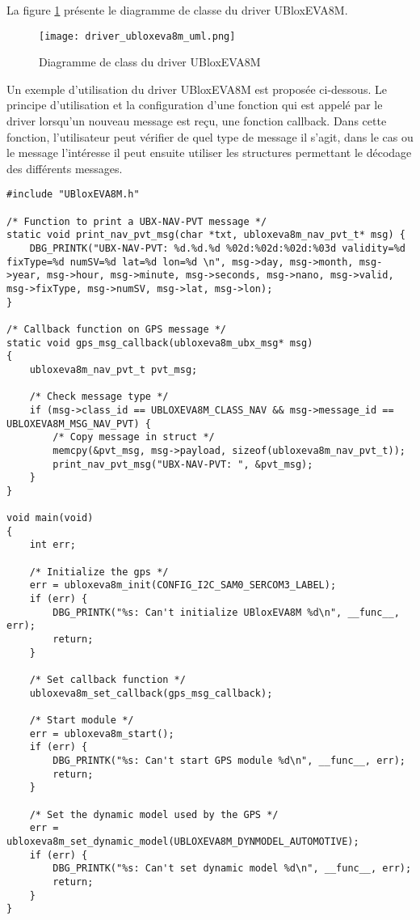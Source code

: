 La figure \ref{fig:driver_ubloxeva8m_uml} présente le diagramme de classe du driver UBloxEVA8M.

\begin{figure}[htb]
\centering 
\texttt{[image: driver\_ubloxeva8m\_uml.png]} 
\caption{Diagramme de class du driver UBloxEVA8M}
\label{fig:driver_ubloxeva8m_uml}
\end{figure}

Un exemple d'utilisation du driver UBloxEVA8M est proposée ci-dessous. Le principe d'utilisation et la configuration d'une fonction qui est appelé par le driver lorsqu'un nouveau message est reçu, une fonction callback. Dans cette fonction, l'utilisateur peut vérifier de quel type de message il s'agit, dans le cas ou le message l'intéresse il peut ensuite utiliser les structures permettant le décodage des différents messages.

\begin{lstlisting}[style=CStyle]
#include "UBloxEVA8M.h"

/* Function to print a UBX-NAV-PVT message */
static void print_nav_pvt_msg(char *txt, ubloxeva8m_nav_pvt_t* msg) {
	DBG_PRINTK("UBX-NAV-PVT: %d.%d.%d %02d:%02d:%02d:%03d validity=%d fixType=%d numSV=%d lat=%d lon=%d \n", msg->day, msg->month, msg->year, msg->hour, msg->minute, msg->seconds, msg->nano, msg->valid, msg->fixType, msg->numSV, msg->lat, msg->lon);
}

/* Callback function on GPS message */
static void gps_msg_callback(ubloxeva8m_ubx_msg* msg)
{
	ubloxeva8m_nav_pvt_t pvt_msg;
	
	/* Check message type */
	if (msg->class_id == UBLOXEVA8M_CLASS_NAV && msg->message_id == UBLOXEVA8M_MSG_NAV_PVT) {
		/* Copy message in struct */
		memcpy(&pvt_msg, msg->payload, sizeof(ubloxeva8m_nav_pvt_t));
		print_nav_pvt_msg("UBX-NAV-PVT: ", &pvt_msg);
	}
}

void main(void)
{
	int err;

	/* Initialize the gps */
	err = ubloxeva8m_init(CONFIG_I2C_SAM0_SERCOM3_LABEL);
	if (err) {
		DBG_PRINTK("%s: Can't initialize UBloxEVA8M %d\n", __func__, err);
		return;
	}

	/* Set callback function */
	ubloxeva8m_set_callback(gps_msg_callback);

	/* Start module */
	err = ubloxeva8m_start();
	if (err) {
		DBG_PRINTK("%s: Can't start GPS module %d\n", __func__, err);
		return;
	}

	/* Set the dynamic model used by the GPS */
	err = ubloxeva8m_set_dynamic_model(UBLOXEVA8M_DYNMODEL_AUTOMOTIVE);
	if (err) {
		DBG_PRINTK("%s: Can't set dynamic model %d\n", __func__, err);
		return;
	}
}
\end{lstlisting}


